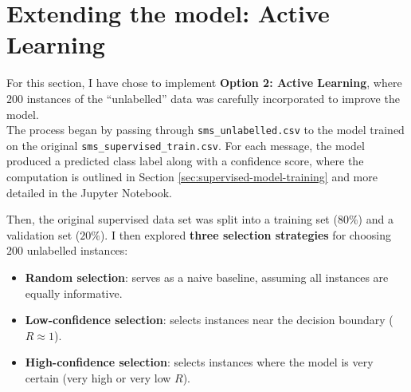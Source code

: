 \documentclass[a4paper,12pt]{article}
\begin{document}
\begin{table}[h!]
\centering
{}
\caption{Boundary Cases (Confidence Ratio $\approx 1$)}
\label{tab:boundary_predictions}
\end{table}
    
\newpage

\section{Extending the model: Active Learning}

For this section, I have chose to implement \textbf{Option 2: Active Learning}, where $200$ instances of the ``unlabelled'' data was carefully incorporated to improve the model. \\

The process began by passing through \texttt{sms\_unlabelled.csv} to the model trained on the original \texttt{sms\_supervised\_train.csv}. For each message, the model produced a predicted class label along with a confidence score, where the computation is outlined in Section \ref{sec:supervised-model-training} and more detailed in the Jupyter Notebook.

Then, the original supervised data set was split into a training set ($80\%$) and a validation set ($20\%$). I then explored \textbf{three selection strategies} for choosing $200$ unlabelled instances:

\begin{itemize}
    \item \textbf{Random selection}: serves as a naive baseline, assuming all instances are equally informative.
    \item \textbf{Low-confidence selection}: selects instances near the decision boundary ($R \approx 1$).
    \item \textbf{High-confidence selection}: selects instances where the model is very certain (very high or very low $R$).
\end{itemize}
\end{document}

